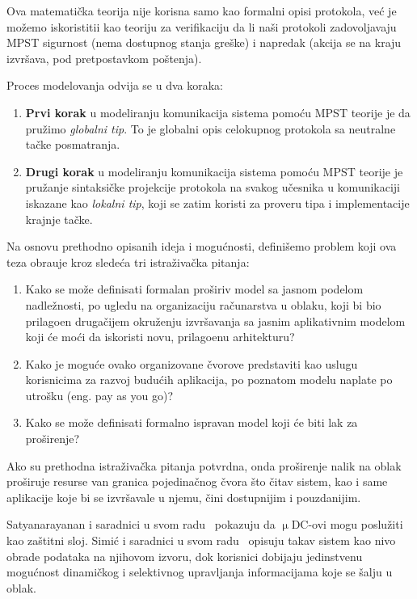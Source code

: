 Ova matemati\v cka teorija nije korisna samo kao formalni opisi protokola, ve\'c je mo\v zemo iskoristitii kao teoriju za verifikaciju da li na\v si protokoli zadovoljavaju MPST sigurnost (nema dostupnog stanja gre\v ske) i napredak (akcija se na kraju izvr\v sava, pod pretpostavkom po\v stenja).

Proces modelovanja odvija se u dva koraka:

\begin{enumerate}[start=1,label={(\bfseries \arabic*)}]
	\item \textbf{Prvi korak} u modeliranju komunikacija sistema pomo\'cu MPST teorije je da pru\v zimo \emph{globalni tip}. To je globalni opis celokupnog protokola sa neutralne ta\v cke posmatranja.
	\item \textbf{Drugi korak} u modeliranju komunikacija sistema pomo\'cu MPST teorije je pru\v zanje sintaksi\v cke projekcije protokola na svakog u\v cesnika u komunikaciji iskazane kao \emph{lokalni tip}, koji se zatim koristi za proveru tipa i implementacije krajnje ta\v cke.
\end{enumerate}

Na osnovu prethodno opisanih ideja i mogu\'cnosti, defini\v semo problem koji ova teza obra\dj uje kroz slede\'ca tri istra\v ziva\v cka pitanja:

\begin{enumerate}[start=1,label={(\bfseries \arabic*)}]\label{rez:questions}
	\item Kako se mo\v ze definisati formalan pro\v siriv model sa jasnom podelom nadle\v znosti, po ugledu na organizaciju ra\v cunarstva u oblaku, koji bi bio prilago\dj en druga\v cijem okru\v zenju izvr\v savanja sa jasnim aplikativnim modelom koji \'ce moći da iskoristi novu, prilago\dj enu arhitekturu?
	\item Kako je mogu\'ce ovako organizovane \v cvorove predstaviti kao uslugu korisnicima za razvoj budu\'cih aplikacija, po poznatom modelu naplate po utro\v sku (eng. pay as you go)?
	\item Kako se mo\v ze definisati formalno ispravan model koji \'ce biti lak za pro\v sirenje?
\end{enumerate}

Ako su prethodna istra\v ziva\v cka pitanja potvrdna, onda pro\v sirenje nalik na oblak pro\v siruje resurse van granica pojedina\v cnog \v cvora \v sto \v citav sistem, kao i same aplikacije koje bi se izvr\v savale u njemu, \v cini dostupnijim i pouzdanijim.

Satyanarayanan i saradnici u svom radu~\cite{SatyanarayananK19} pokazuju da $\upmu$DC-ovi mogu poslu\v ziti kao za\v stitni sloj. Simi\'c i saradnici u svom radu~\cite{inproceedingsSimic1}  opisuju takav sistem kao nivo obrade podataka na njihovom izvoru, dok korisnici dobijaju jedinstvenu mogu\'cnost dinami\v ckog i selektivnog upravljanja informacijama koje se \v salju u oblak. 

